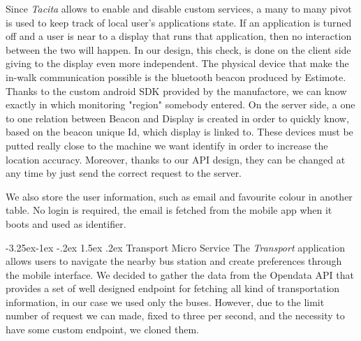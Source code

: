 \documentclass[]{usiinfbachelorproject}
\makeatletter
\newcommand\subsubsection{\@startsection{subsubsection}{3}{\z@}%
                {-3.25ex\@plus -1ex \@minus -.2ex}%
                {1.5ex \@plus .2ex}%
                {\normalfont\normalsize\bfseries}}
\makeatother
\begin{document}
Since \emph{Tacita} allows to enable and disable custom services, a many to many pivot is used to keep track of local user's applications state. If an application is turned off and a user is near to a display that runs that application, then no interaction between the two will happen. In our design, this check, is done on the client side giving to the display even more independent.
The physical device that make the in-walk communication possible is the bluetooth beacon produced by Estimote. Thanks to the custom android SDK provided by the manufactore, we can know exactly in which monitoring "region" somebody entered. On the server side, a one to one relation between Beacon and Display is created in order to quickly know, based on the beacon unique Id, which display is linked to. These devices must be putted really close to the machine we want identify in order to increase the location accuracy. Moreover, thanks to our API design, they can be changed at any time by just send the correct request to the server.

\begin{figure}[H]
  \centering
\end{figure} 




We also store the user information, such as email and favourite colour in another table. No login is required, the email is fetched from the mobile app when it boots and used as identifier. 

\subsubsection{Transport Micro Service}
The \emph{Transport} application allows users to navigate the nearby bus station and create preferences through the mobile interface. We decided to gather the data from the Opendata API that provides a set of well designed endpoint for fetching all kind of transportation information, in our case we used only the buses. However, due to the limit number of request we can made, fixed to three per second, and the necessity to have some custom endpoint, we cloned them.
\end{document}
